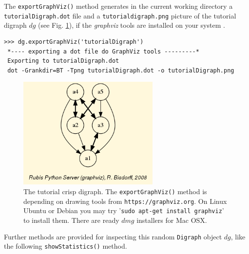 The \texttt{exportGraphViz()} method generates in the current working directory a \texttt{tutorialDigraph.dot} file and a \texttt{tutorialdigraph.png} picture of the tutorial digraph $dg$ (see Fig. \ref{fig:1.1}), if the \emph{graphviz} tools are installed on your system \citep{graphViz}.
\begin{lstlisting}
>>> dg.exportGraphViz('tutorialDigraph')
 *---- exporting a dot file do GraphViz tools ---------*
 Exporting to tutorialDigraph.dot
 dot -Grankdir=BT -Tpng tutorialDigraph.dot -o tutorialDigraph.png
\end{lstlisting}
\begin{figure}[h]
\sidecaption[t]
\includegraphics[width=7cm]{Figures/tutorialDigraph.png}
\caption{The tutorial crisp digraph. The \texttt{exportGraphViz()} method is depending on drawing tools from \texttt{https://graphviz.org}. On Linux Ubuntu or Debian you may try '\texttt{sudo apt-get install graphviz}’ to install them. There are ready $dmg$ installers for Mac OSX.}
\label{fig:1.1}       %
\end{figure}

Further methods are provided for inspecting this random \texttt{Digraph} object $dg$, like the following \texttt{showStatistics()} method.

